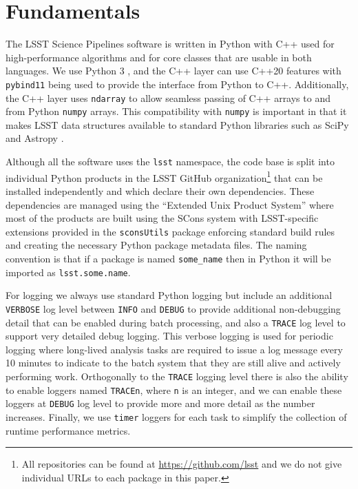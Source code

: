\section{Fundamentals}
\label{sec:support}

The LSST Science Pipelines software is written in Python with C++ used for high-performance algorithms and for core classes that are usable in both languages.
We use Python 3 \citep[having ported from Python 2,][currently with a minimum version of Python 3.13]{2020ASPC..522..541J}, and the C++ layer can use C++20 features with \texttt{pybind11} being used to provide the interface from Python to C++.
Additionally, the C++ layer uses \texttt{ndarray} to allow seamless passing of C++ arrays to and from Python \texttt{numpy} arrays.
This compatibility with \texttt{numpy} is important in that it makes LSST data structures available to standard Python libraries such as SciPy and Astropy \citep{2016SPIE.9913E..0GJ,2018AJ....156..123A}.

Although all the software uses the \texttt{lsst} namespace, the code base is split into individual Python products in the LSST GitHub organization\footnote{All repositories can be found at \url{https://github.com/lsst} and we do not give individual URLs to each package in this paper.} that can be installed independently and which declare their own dependencies.
These dependencies are managed using the ``Extended Unix Product System'' \citep[EUPS;][]{EUPS,2018SPIE10707E..09J} where
most of the products are built using the SCons system \citep{2005Scons1377085} with LSST-specific extensions provided in the \texttt{sconsUtils} package enforcing standard build rules and creating the necessary Python package metadata files.
The naming convention is that if a package is named \texttt{some\_name} then in Python it will be imported as \texttt{lsst.some.name}.

For logging we always use standard Python logging but include an additional \texttt{VERBOSE} log level between \texttt{INFO} and \texttt{DEBUG} to provide additional non-debugging detail that can be enabled during batch processing, and also a \texttt{TRACE} log level to support very detailed debug logging.
This verbose logging is used for periodic logging where long-lived analysis tasks are required to issue a log message every 10 minutes to indicate to the batch system that they are still alive and actively performing work.
Orthogonally to the \texttt{TRACE} logging level there is also the ability to enable loggers named \texttt{TRACEn}, where \texttt{n} is an integer, and we can enable these loggers at \texttt{DEBUG} log level to provide more and more detail as the number increases.
Finally, we use \texttt{timer} loggers for each task to simplify the collection of runtime performance metrics.

